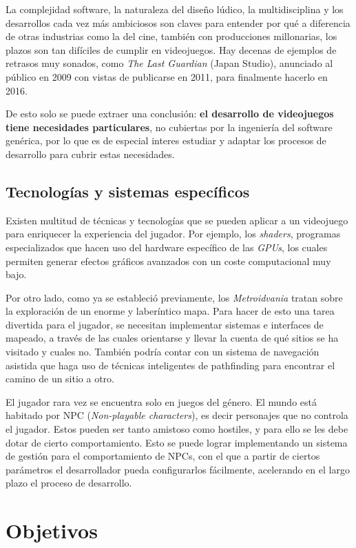 La complejidad software, la naturaleza del diseño lúdico, la multidisciplina y los desarrollos cada vez más ambiciosos son claves para entender por qué a diferencia de otras industrias como la del cine, también con producciones millonarias, los plazos son tan difíciles de cumplir en videojuegos. Hay decenas de ejemplos de retrasos muy sonados, como \textit{The Last Guardian} (Japan Studio), anunciado al público en 2009 con vistas de publicarse en 2011, para finalmente hacerlo en 2016. 

De esto solo se puede extraer una conclusión: \textbf{el desarrollo de videojuegos tiene necesidades particulares}, no cubiertas por la ingeniería del software genérica, por lo que es de especial interes estudiar y adaptar los procesos de desarrollo para cubrir estas necesidades.

\subsection{Tecnologías y sistemas específicos}

Existen multitud de técnicas y tecnologías que se pueden aplicar a un videojuego para enriquecer la experiencia del jugador. Por ejemplo, los \textit{shaders}, programas especializados que hacen uso del hardware específico de las \textit{GPUs}, los cuales permiten generar efectos gráficos avanzados con un coste computacional muy bajo.

Por otro lado, como ya se estableció previamente, los \textit{Metroidvania} tratan sobre la exploración de un enorme y laberíntico mapa. Para hacer de esto una tarea divertida para el jugador, se necesitan implementar sistemas e interfaces de mapeado, a través de las cuales orientarse y llevar la cuenta de qué sitios se ha visitado y cuales no. También podría contar con un sistema de navegación asistida que haga uso de técnicas inteligentes de pathfinding para encontrar el camino de un sitio a otro.

El jugador rara vez se encuentra solo en juegos del género. El mundo está habitado por NPC (\textit{Non-playable characters}), es decir personajes que no controla el jugador. Estos pueden ser tanto amistoso como hostiles, y para ello se les debe dotar de cierto comportamiento. Esto se puede lograr implementando un sistema de gestión para el comportamiento de NPCs, con el que a partir de ciertos parámetros el desarrollador pueda configurarlos fácilmente, acelerando en el largo plazo el proceso de desarrollo.


\section{Objetivos}

